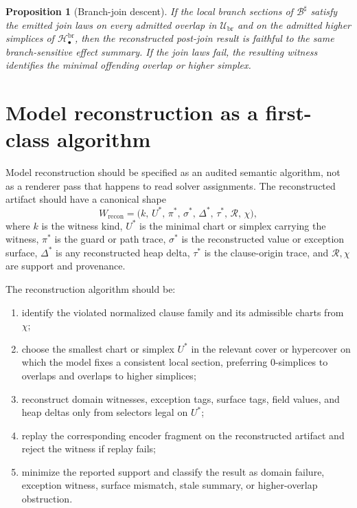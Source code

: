 \documentclass[11pt]{report}
\newtheorem{proposition}[definition]{Proposition}
\begin{document}
\begin{proposition}[Branch-join descent]
If the local branch sections of $\mathcal{B}^{\sharp}$ satisfy the emitted join laws on every admitted overlap in $\mathcal{U}_{\mathrm{br}}$ and on the admitted higher simplices of $\mathcal{H}^{\mathrm{br}}_{\bullet}$, then the reconstructed post-join result is faithful to the same branch-sensitive effect summary. If the join laws fail, the resulting witness identifies the minimal offending overlap or higher simplex.
\end{proposition}

\section{Model reconstruction as a first-class algorithm}
Model reconstruction should be specified as an audited semantic algorithm, not as a renderer pass that happens to read solver assignments. The reconstructed artifact should have a canonical shape
\[
W_{\mathrm{recon}}
=
\bigl(
k,\,
U^{*},\,
\pi^{*},\,
\sigma^{*},\,
\Delta^{*},\,
\tau^{*},\,
\mathcal{R},\,
\chi
\bigr),
\]
where $k$ is the witness kind, $U^{*}$ is the minimal chart or simplex carrying the witness, $\pi^{*}$ is the guard or path trace, $\sigma^{*}$ is the reconstructed value or exception surface, $\Delta^{*}$ is any reconstructed heap delta, $\tau^{*}$ is the clause-origin trace, and $\mathcal{R},\chi$ are support and provenance.

The reconstruction algorithm should be:
\begin{enumerate}
\item identify the violated normalized clause family and its admissible charts from $\chi$;
\item choose the smallest chart or simplex $U^{*}$ in the relevant cover or hypercover on which the model fixes a consistent local section, preferring $0$-simplices to overlaps and overlaps to higher simplices;
\item reconstruct domain witnesses, exception tags, surface tags, field values, and heap deltas only from selectors legal on $U^{*}$;
\item replay the corresponding encoder fragment on the reconstructed artifact and reject the witness if replay fails;
\item minimize the reported support and classify the result as domain failure, exception witness, surface mismatch, stale summary, or higher-overlap obstruction.
\end{enumerate}
\end{document}
